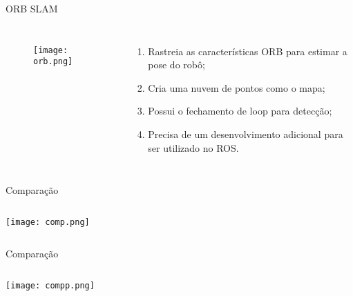 \begin{frame}[c]{ORB SLAM}
    \transboxout[duration=0.5]
    \begin{columns}
            \begin{figure}
            \texttt{[image: orb.png]}
            \caption{\cite{ORBSLAM323}}
            \end{figure}
            \begin{enumerate}
                \item Rastreia as características ORB para estimar a pose do robô;
                \item Cria uma nuvem de pontos como o mapa;
                \item Possui o fechamento de loop para detecção;
                \item Precisa de um desenvolvimento adicional para ser utilizado no ROS.
            \end{enumerate}
    \end{columns}

\end{frame}
\begin{frame}[t]{Comparação}
    \transboxout[duration=0.5]
    \begin{columns}
            \texttt{[image: comp.png]}       
    \end{columns}
\end{frame}
\begin{frame}[t]{Comparação}
    \transboxout[duration=0.5]
    \begin{columns}
            \texttt{[image: compp.png]}       
    \end{columns}
\end{frame}
